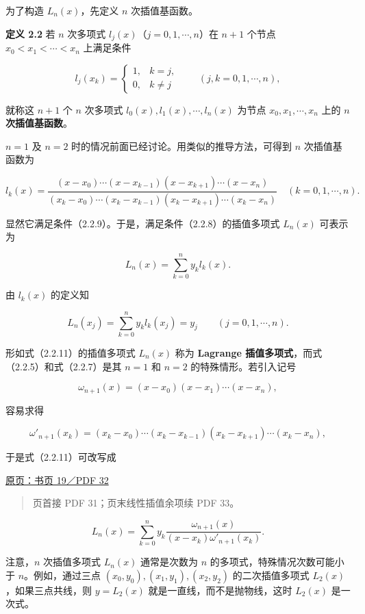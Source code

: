 \documentclass[
  10pt,
  fontset=fandol]{ctexart}
\begin{document}
为了构造 \(L_n(x)\)，先定义 \(n\) 次插值基函数。

\textbf{定义 2.2} 若 \(n\) 次多项式 \(l_j(x)\)（\(j=0,1,\cdots,n\)）在 \(n+1\) 个节点 \(x_0<x_1<\cdots<x_n\) 上满足条件

\[
l_j(x_k)=
\begin{cases}
1,&k=j,\\
0,&k\ne j
\end{cases}
\qquad(j,k=0,1,\cdots,n),
\tag{2.2.9}
\]

就称这 \(n+1\) 个 \(n\) 次多项式 \(l_0(x),l_1(x),\cdots,l_n(x)\) 为节点 \(x_0,x_1,\cdots,x_n\) 上的 \textbf{\(n\) 次插值基函数}。

\(n=1\) 及 \(n=2\) 时的情况前面已经讨论。用类似的推导方法，可得到 \(n\) 次插值基函数为

\[
l_k(x)=
\frac{(x-x_0)\cdots(x-x_{k-1})(x-x_{k+1})\cdots(x-x_n)}
{(x_k-x_0)\cdots(x_k-x_{k-1})(x_k-x_{k+1})\cdots(x_k-x_n)}
\quad(k=0,1,\cdots,n).
\tag{2.2.10}
\]

显然它满足条件（2.2.9）。于是，满足条件（2.2.8）的插值多项式 \(L_n(x)\) 可表示为

\[
L_n(x)=\sum_{k=0}^{n}y_kl_k(x).
\tag{2.2.11}
\]

由 \(l_k(x)\) 的定义知

\[
L_n(x_j)=\sum_{k=0}^{n}y_kl_k(x_j)=y_j
\qquad(j=0,1,\cdots,n).
\]

形如式（2.2.11）的插值多项式 \(L_n(x)\) 称为 \textbf{Lagrange 插值多项式}，而式（2.2.5）和式（2.2.7）是其 \(n=1\) 和 \(n=2\) 的特殊情形。若引入记号

\[
\omega_{n+1}(x)=(x-x_0)(x-x_1)\cdots(x-x_n),
\tag{2.2.12}
\]

容易求得

\[
\omega'_{n+1}(x_k)
=(x_k-x_0)\cdots(x_k-x_{k-1})(x_k-x_{k+1})\cdots(x_k-x_n),
\]

于是式（2.2.11）可改写成

\href{../../source-images/pdf-032.jpeg}{原页：书页 19／PDF 32}

\begin{quote}
页首接 PDF 31；页末线性插值余项续 PDF 33。
\end{quote}

\[
L_n(x)=\sum_{k=0}^{n}y_k
\frac{\omega_{n+1}(x)}
{(x-x_k)\omega'_{n+1}(x_k)}.
\tag{2.2.13}
\]

注意，\(n\) 次插值多项式 \(L_n(x)\) 通常是次数为 \(n\) 的多项式，特殊情况次数可能小于 \(n\)。例如，通过三点 \((x_0,\allowbreak y_0),\allowbreak (x_1,\allowbreak y_1),\allowbreak (x_2,\allowbreak y_2)\) 的二次插值多项式 \(L_2(x)\)，如果三点共线，则 \(y=L_2(x)\) 就是一直线，而不是抛物线，这时 \(L_2(x)\) 是一次式。
\end{document}
